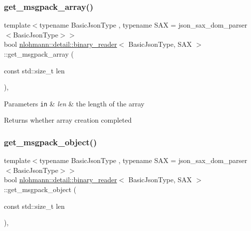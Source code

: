 \subsubsection{\texorpdfstring{get\+\_\+msgpack\+\_\+array()}{get\_msgpack\_array()}}
{\footnotesize\ttfamily template$<$typename Basic\+Json\+Type , typename S\+AX  = json\+\_\+sax\+\_\+dom\+\_\+parser$<$\+Basic\+Json\+Type$>$$>$ \\
bool \hyperlink{classnlohmann_1_1detail_1_1binary__reader}{nlohmann\+::detail\+::binary\+\_\+reader}$<$ Basic\+Json\+Type, S\+AX $>$\+::get\+\_\+msgpack\+\_\+array (\begin{DoxyParamCaption}\item[{const std\+::size\+\_\+t}]{len }\end{DoxyParamCaption})\hspace{0.3cm}{\ttfamily [inline]}, {\ttfamily [private]}}


\begin{DoxyParams}[1]{Parameters}
\mbox{\tt in}  & {\em len} & the length of the array \\
\hline
\end{DoxyParams}
\begin{DoxyReturn}{Returns}
whether array creation completed 
\end{DoxyReturn}
\mbox{\label{classnlohmann_1_1detail_1_1binary__reader_ad1190bb3499e243b0bbf795743a35563}} 
\subsubsection{\texorpdfstring{get\+\_\+msgpack\+\_\+object()}{get\_msgpack\_object()}}
{\footnotesize\ttfamily template$<$typename Basic\+Json\+Type , typename S\+AX  = json\+\_\+sax\+\_\+dom\+\_\+parser$<$\+Basic\+Json\+Type$>$$>$ \\
bool \hyperlink{classnlohmann_1_1detail_1_1binary__reader}{nlohmann\+::detail\+::binary\+\_\+reader}$<$ Basic\+Json\+Type, S\+AX $>$\+::get\+\_\+msgpack\+\_\+object (\begin{DoxyParamCaption}\item[{const std\+::size\+\_\+t}]{len }\end{DoxyParamCaption})\hspace{0.3cm}{\ttfamily [inline]}, {\ttfamily [private]}}


